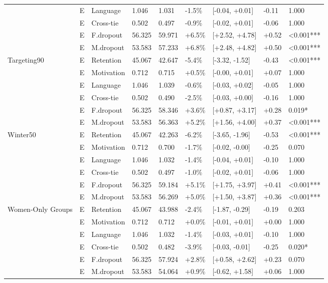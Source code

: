 \begin{longtable}[t]{lllllllll}
  & E & Language & 1.046 & 1.031 & -1.5\% & [-0.04, +0.01] & -0.11 & 1.000\\
  & E & Cross-tie & 0.502 & 0.497 & -0.9\% & [-0.02, +0.01] & -0.06 & 1.000\\
  & E & F.dropout & 56.325 & 59.971 & +6.5\% & [+2.52, +4.78] & +0.52 & <0.001***\\
  & E & M.dropout & 53.583 & 57.233 & +6.8\% & [+2.48, +4.82] & +0.50 & <0.001***\\
\midrule
Targeting90 & E & Retention & 45.067 & 42.647 & -5.4\% & [-3.32, -1.52] & -0.43 & <0.001***\\
  & E & Motivation & 0.712 & 0.715 & +0.5\% & [-0.00, +0.01] & +0.07 & 1.000\\
  & E & Language & 1.046 & 1.039 & -0.6\% & [-0.03, +0.02] & -0.05 & 1.000\\
  & E & Cross-tie & 0.502 & 0.490 & -2.5\% & [-0.03, +0.00] & -0.16 & 1.000\\
  & E & F.dropout & 56.325 & 58.346 & +3.6\% & [+0.87, +3.17] & +0.28 & 0.019*\\
  & E & M.dropout & 53.583 & 56.363 & +5.2\% & [+1.56, +4.00] & +0.37 & <0.001***\\
\midrule
Winter50 & E & Retention & 45.067 & 42.263 & -6.2\% & [-3.65, -1.96] & -0.53 & <0.001***\\
  & E & Motivation & 0.712 & 0.700 & -1.7\% & [-0.02, -0.00] & -0.25 & 0.070\\
  & E & Language & 1.046 & 1.032 & -1.4\% & [-0.04, +0.01] & -0.10 & 1.000\\
  & E & Cross-tie & 0.502 & 0.497 & -1.0\% & [-0.02, +0.01] & -0.06 & 1.000\\
  & E & F.dropout & 56.325 & 59.184 & +5.1\% & [+1.75, +3.97] & +0.41 & <0.001***\\
  & E & M.dropout & 53.583 & 56.269 & +5.0\% & [+1.50, +3.87] & +0.36 & <0.001***\\
\midrule
Women-Only Groups & E & Retention & 45.067 & 43.988 & -2.4\% & [-1.87, -0.29] & -0.19 & 0.203\\
  & E & Motivation & 0.712 & 0.712 & +0.0\% & [-0.01, +0.01] & +0.00 & 1.000\\
  & E & Language & 1.046 & 1.032 & -1.4\% & [-0.03, +0.01] & -0.10 & 1.000\\
  & E & Cross-tie & 0.502 & 0.482 & -3.9\% & [-0.03, -0.01] & -0.25 & 0.020*\\
  & E & F.dropout & 56.325 & 57.924 & +2.8\% & [+0.58, +2.62] & +0.23 & 0.070\\
  & E & M.dropout & 53.583 & 54.064 & +0.9\% & [-0.62, +1.58] & +0.06 & 1.000\\

\end{longtable}
